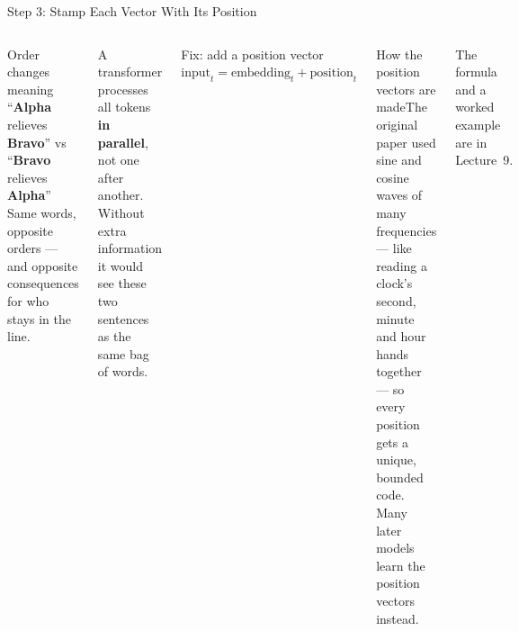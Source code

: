 \documentclass[aspectratio=169,10pt]{beamer}
\begin{document}
\begin{frame}{Step 3: Stamp Each Vector With Its Position}
\begin{columns}[T]
\begin{cbox}{Order changes meaning}\scriptsize
``\textbf{Alpha} relieves \textbf{Bravo}'' \quad vs \quad ``\textbf{Bravo} relieves \textbf{Alpha}''\\
Same words, opposite orders --- and opposite consequences for who stays in the line.
\end{cbox}
\begin{wbox}\scriptsize A transformer processes all tokens \textbf{in parallel}, not one after another. Without extra information it would see these two sentences as the same bag of words.\end{wbox}
\begin{fbx}{Fix: add a position vector}
$\text{input}_t=\text{embedding}_t+\text{position}_t$
\end{fbx}
\begin{cbox}{How the position vectors are made}\scriptsize The original paper used sine and cosine waves of many frequencies --- like reading a clock's second, minute and hour hands together --- so every position gets a unique, bounded code. Many later models learn the position vectors instead.\end{cbox}
\begin{ibox}\scriptsize The formula and a worked example are in Lecture~9.\end{ibox}
\end{columns}
\end{frame}
\end{document}
